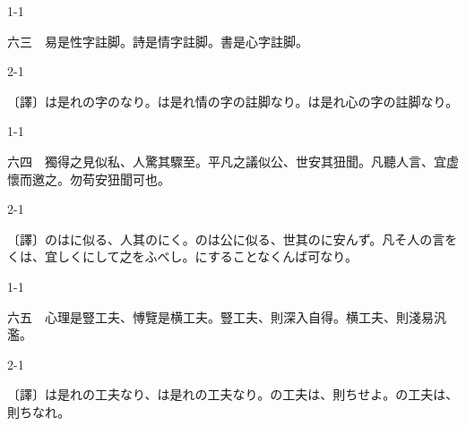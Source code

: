 \documentclass[tate,paper=b6j,jafontsize=9pt]{jlreq}
\begin{document}
\begin{azconvIndented}{1\zw}{-1\zw}

六三　易是性字註脚。詩是情字註脚。書是心字註脚。

\end{azconvIndented}
\begin{azconvIndented}{2\zw}{-1\zw}

〔譯〕は是れの字のなり。は是れ情の字の註脚なり。は是れ心の字の註脚なり。

\end{azconvIndented}

\begin{azconvIndented}{1\zw}{-1\zw}

六四　獨得之見似私、人驚其驟至。平凡之議似公、世安其狃聞。凡聽人言、宜虚懷而邀\azconvKunten{\azconvIR}之。勿苟安狃聞可也。

\end{azconvIndented}
\begin{azconvIndented}{2\zw}{-1\zw}

〔譯〕のはに似る、人其のにく。のは公に似る、世其のに安んず。凡そ人の言をくは、宜しくにして之をふべし。にすることなくんば可なり。

\end{azconvIndented}

\begin{azconvIndented}{1\zw}{-1\zw}

六五　心理是豎工夫、愽覽是横工夫。豎工夫、則深入自得。横工夫、則淺易汎濫。

\end{azconvIndented}
\begin{azconvIndented}{2\zw}{-1\zw}

〔譯〕は是れの工夫なり、は是れの工夫なり。の工夫は、則ちせよ。の工夫は、則ちなれ。

\end{azconvIndented}
\end{document}
